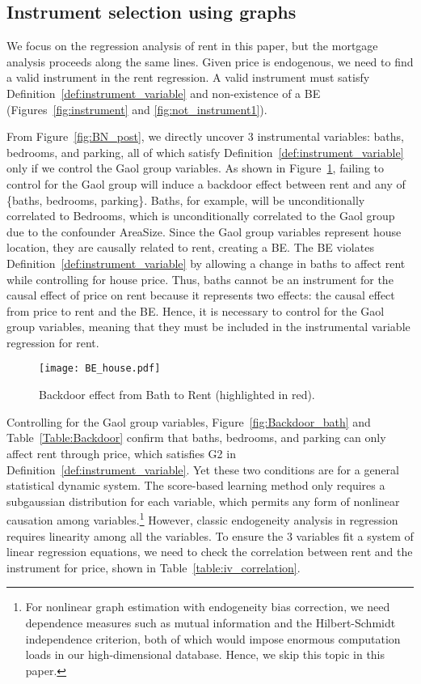 \documentclass[11pt,review,authoryear]{elsarticle}
\begin{document}
\subsection{Instrument selection using graphs}

We focus on the regression analysis of rent in this paper, but the mortgage analysis proceeds along the same lines. Given price is endogenous, we need to find a valid instrument in the rent regression. A valid instrument must satisfy Definition~\ref{def:instrument_variable} and non-existence of a BE (Figures~\ref{fig:instrument} and \ref{fig:not_instrument1}).

From Figure~\ref{fig:BN_post}, we directly uncover 3 instrumental variables: baths, bedrooms, and parking, all of which satisfy Definition~\ref{def:instrument_variable} only if we control the Gaol group variables. As shown in Figure~\ref{fig:BE_house}, failing to control for the Gaol group will induce a backdoor effect between rent and any of \{baths, bedrooms, parking\}. Baths, for example, will be unconditionally correlated to Bedrooms, which is unconditionally correlated to the Gaol group due to the confounder AreaSize. Since the Gaol group variables represent house location, they are causally related to rent, creating a BE. The BE violates Definition~\ref{def:instrument_variable} by allowing a change in baths to affect rent while controlling for house price. Thus, baths cannot be an instrument for the causal effect of price on rent because it represents two effects: the causal effect from price to rent and the BE. Hence, it is necessary to control for the Gaol group variables, meaning that they must be included in the instrumental variable regression for rent.

\begin{figure}[H]
  \centering
  \texttt{[image: BE\_house.pdf]}
  \caption{Backdoor effect from Bath to Rent (highlighted in red).}
  \label{fig:BE_house}
\end{figure}

Controlling for the Gaol group variables, Figure~\ref{fig:Backdoor_bath} and Table~\ref{Table:Backdoor} confirm that baths, bedrooms, and parking can only affect rent through price, which satisfies G2 in Definition~\ref{def:instrument_variable}. Yet these two conditions are for a general statistical dynamic system. The score-based learning method only requires a subgaussian distribution for each variable, which permits any form of nonlinear causation among variables.\footnote{For nonlinear graph estimation with endogeneity bias correction, we need dependence measures such as mutual information and the Hilbert-Schmidt independence criterion, both of which would impose enormous computation loads in our high-dimensional database. Hence, we skip this topic in this paper.} However, classic endogeneity analysis in regression requires linearity among all the variables. To ensure the 3 variables fit a system of linear regression equations, we need to check the correlation between rent and the instrument for price, shown in Table~\ref{table:iv_correlation}.
\end{document}
